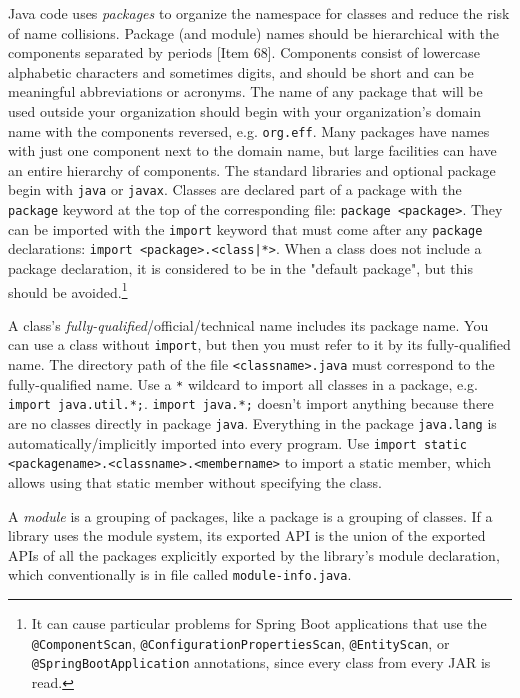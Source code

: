 \documentclass[table, xcdraw]{article}%
\begin{document}
Java code uses \emph{packages} to organize the namespace for classes and reduce the risk of name collisions. Package (and module) names should be hierarchical with the components separated by periods [Item 68]. Components consist of lowercase alphabetic characters and sometimes digits, and should be short and can be meaningful abbreviations or acronyms. The name of any package that will be used outside your organization should begin with your organization’s domain name with the components reversed, e.g. \texttt{org.eff}. Many packages have names with just one component next to the domain name, but large facilities can have an entire hierarchy of components. The standard libraries and optional package begin with \texttt{java} or \texttt{javax}. Classes are declared part of a package with the \texttt{package} keyword at the top of the corresponding file: \texttt{package <package>}. They can be imported with the \texttt{import} keyword that must come after any \texttt{package} declarations: \texttt{import <package>.<class|*>}. When a class does not include a package declaration, it is considered to be in the "default package", but this should be avoided.\footnote{It can cause particular problems for Spring Boot applications that use the \texttt{@ComponentScan}, \texttt{@ConfigurationPropertiesScan}, \texttt{@EntityScan}, or \texttt{@SpringBootApplication} annotations, since every class from every JAR is read.}

A class's \emph{fully-qualified}/official/technical name includes its package name. You can use a class without \texttt{import}, but then you must refer to it by its fully-qualified name. The directory path of the file \texttt{<classname>.java} must correspond to the fully-qualified name. Use a \texttt{*} wildcard to import all classes in a package, e.g. \texttt{import java.util.*;}. \texttt{import java.*;} doesn't import anything because there are no classes directly in package \texttt{java}. Everything in the package \texttt{java.lang} is automatically/implicitly imported into every program. Use \texttt{import static <packagename>.<classname>.<membername>} to import a static member, which allows using that static member without specifying the class.

A \emph{module} is a grouping of packages, like a package is a grouping of classes. If a library uses the module system, its exported API is the union of the exported APIs of all the packages explicitly exported by the library’s module declaration, which conventionally is in file called \texttt{module-info.java}.
\end{document}
